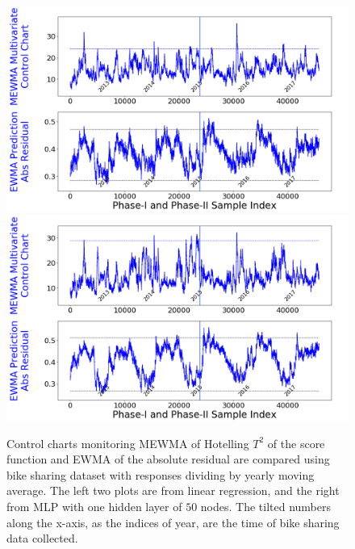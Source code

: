 \documentclass[twoside,11pt]{article}
\begin{document}
\begin{figure}[!htbp]
\centering
\includegraphics[width = 0.49\linewidth]{../figures/v14/bike_sharing/reg_norm_scal_train/bike_reg_1e-08_0_0001_0_005_99_0.png}
\includegraphics[width = 0.49\linewidth]{../figures/v14/bike_sharing/reg_norm_nnet_scal_train/bike_reg_0_1_0_0001_0_005_99_0.png}
  \caption{
Control charts monitoring MEWMA of Hotelling $T^2$ of the score function and EWMA of the absolute residual are compared using bike sharing dataset with responses dividing by yearly moving average. The left two plots are from linear regression, and the right from MLP with one hidden layer of $50$ nodes. The tilted numbers along the x-axis, as the indices of year, are the time of bike sharing data collected.
}
\label{fig:bike_sharing_preproc}
\end{figure}
\end{document}
